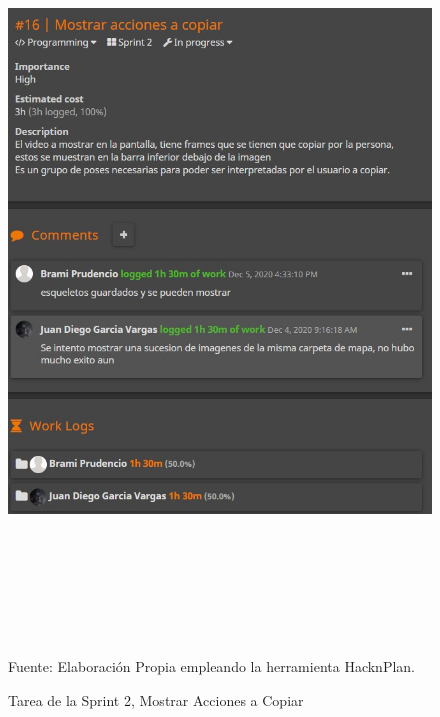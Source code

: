 \clearpage
\begin{figure}[t!]
	\centering
	\includegraphics[width=15cm,height=20cm,]{./Images/tareaexample.jpg}
	\caption{Tarea de la Sprint 2, Mostrar Acciones a Copiar}
	\footnotesize Fuente: Elaboración Propia empleando la herramienta HacknPlan.
	\label{sprinttarea}
\end{figure}

\clearpage
